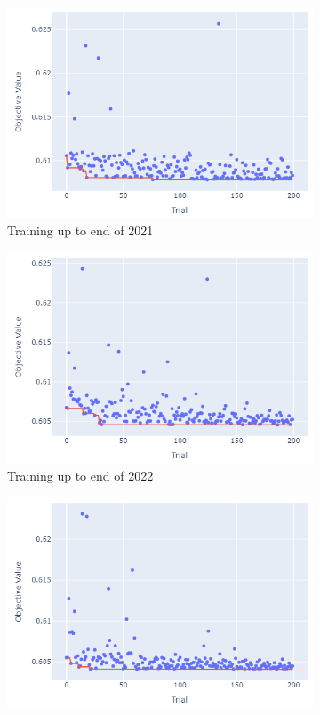 \documentclass[12pt,twoside]{report}
\begin{document}
\begin{figure}[htb]
\begin{subfigure}{.33\linewidth}
  \includegraphics[width=0.95\linewidth]{figures/va_lr_cutoff_2021.png}
  \caption{Training up to end of 2021}
\end{subfigure}
\par\bigskip
\par\bigskip
\begin{subfigure}{.33\linewidth}
  \centering
  \includegraphics[width=0.95\linewidth]{figures/va_lr_cutoff_2022.png}
  \caption{Training up to end of 2022}
\end{subfigure}%
\begin{subfigure}{.33\linewidth}
  \centering
  \includegraphics[width=0.95\linewidth]{figures/va_lr_cutoff_2023.png}

\end{subfigure}
\end{figure}
\end{document}
